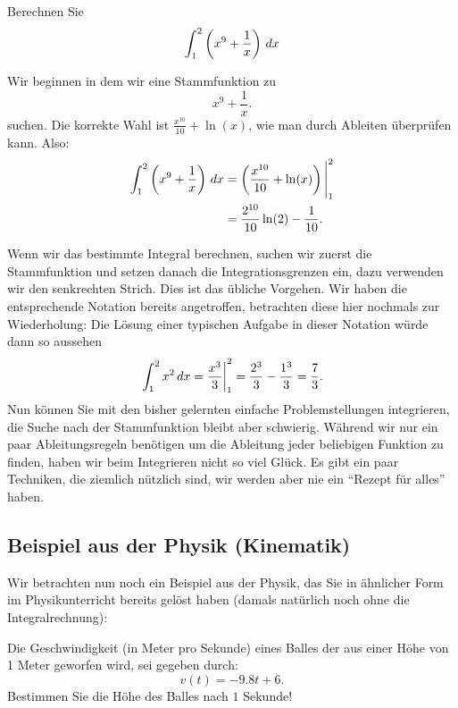 \begin{example}
Berechnen Sie
\[
\int_1^2\left(x^9 + \frac{1}{x}\right) \, d x
\]
\end{example}

\begin{solution}
Wir beginnen in dem wir eine Stammfunktion zu 
\[
x^9 + \frac{1}{x}.
\]
suchen. Die korrekte Wahl ist $\frac{x^{10}}{10} + \ln(x)$, wie man durch Ableiten überprüfen kann. Also:
\begin{align*}
\int_1^2\left(x^9 + \frac{1}{x}\right) \, d x &= \left(\frac{x^{10}}{10} + \ln(x)\right)\Bigg|_1^2 \\
&= \frac{2^{10}}{10} \ln(2) - \frac{1}{10}.
\end{align*}
\end{solution}

Wenn wir das bestimmte Integral berechnen, suchen wir zuerst die Stammfunktion und setzen danach die Integrationsgrenzen ein, dazu verwenden wir den senkrechten Strich. Dies ist das übliche Vorgehen. Wir haben die entsprechende Notation bereits angetroffen, betrachten diese hier nochmals zur Wiederholung: Die Lösung einer typischen Aufgabe in dieser Notation würde dann so aussehen
\[
  \left.\int_1^2 x^2\, d x={x^3\over 3}\right|_1^2 = 
  {2^3\over3}-{1^3\over3}={7\over3}.
\]
Nun können Sie mit den bisher gelernten einfache Problemstellungen integrieren, die Suche nach der Stammfunktion bleibt aber schwierig. Während wir nur ein paar Ableitungsregeln benötigen um die Ableitung jeder beliebigen Funktion zu finden, haben wir beim Integrieren nicht so viel Glück. Es gibt ein paar Techniken, die ziemlich nützlich sind, wir werden aber nie ein ``Rezept für alles'' haben.




\subsection*{Beispiel aus der Physik (Kinematik)}

Wir betrachten nun noch ein Beispiel aus der Physik, das Sie in ähnlicher Form im Physikunterricht bereits gelöst haben (damals natürlich noch ohne die Integralrechnung):

\begin{example}
Die Geschwindigkeit (in Meter pro Sekunde) eines Balles der aus einer Höhe von 1 Meter geworfen wird, sei gegeben durch:
\[
v(t) = -9.8t + 6.
\]
Bestimmen Sie die Höhe des Balles nach $1$ Sekunde!
\end{example}

